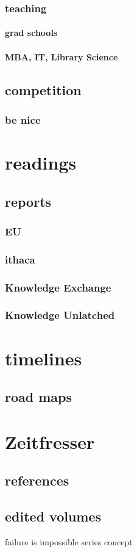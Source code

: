 \documentclass[output=guidelines,guidelines] {langscibook}
\begin{document}
\subsection{teaching}
\subsubsection{grad schools}
\subsubsection{MBA, IT, Library Science}
\section{competition}
\subsection{be nice}
\chapter{readings}
\section{reports}
\subsection{EU}
\subsection{ithaca}
\subsection{Knowledge Exchange}
\subsection{Knowledge Unlatched}
\chapter{timelines}
\section{road maps}
\chapter{Zeitfresser}
\section{references}
\section{edited volumes}

failure is impossible
series concept
\end{document}

